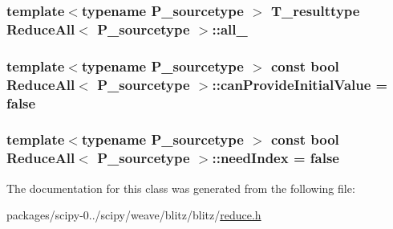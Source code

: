 \subsubsection[{all\+\_\+}]{\setlength{\rightskip}{0pt plus 5cm}template$<$typename P\+\_\+sourcetype $>$ {\bf T\+\_\+resulttype} {\bf Reduce\+All}$<$ P\+\_\+sourcetype $>$\+::all\+\_\+\hspace{0.3cm}{\ttfamily [protected]}}\label{classReduceAll_a8f66a3b45ced05f78e3ce051c663b081}
\hypertarget{classReduceAll_ae5f5ceb1b8070d3f573c8a06aade09a9}{}
\subsubsection[{can\+Provide\+Initial\+Value}]{\setlength{\rightskip}{0pt plus 5cm}template$<$typename P\+\_\+sourcetype $>$ const {\bf bool} {\bf Reduce\+All}$<$ P\+\_\+sourcetype $>$\+::can\+Provide\+Initial\+Value = {\bf false}\hspace{0.3cm}{\ttfamily [static]}}\label{classReduceAll_ae5f5ceb1b8070d3f573c8a06aade09a9}
\hypertarget{classReduceAll_ae4994bdeee71db701d286424d0c2f501}{}
\subsubsection[{need\+Index}]{\setlength{\rightskip}{0pt plus 5cm}template$<$typename P\+\_\+sourcetype $>$ const {\bf bool} {\bf Reduce\+All}$<$ P\+\_\+sourcetype $>$\+::need\+Index = {\bf false}\hspace{0.3cm}{\ttfamily [static]}}\label{classReduceAll_ae4994bdeee71db701d286424d0c2f501}


The documentation for this class was generated from the following file\+:\begin{DoxyCompactItemize}
\item 
packages/scipy-\/0../scipy/weave/blitz/blitz/\hyperlink{reduce_8h}{reduce.\+h}\end{DoxyCompactItemize}
